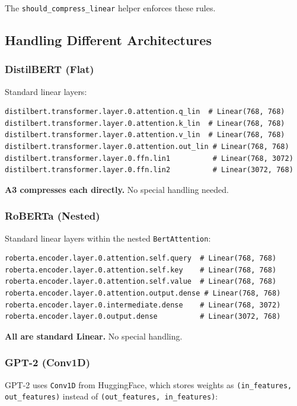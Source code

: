 The \texttt{should\_compress\_linear} helper enforces these rules.

\subsection{Handling Different Architectures}

\subsubsection{DistilBERT (Flat)}

Standard linear layers:

\begin{lstlisting}
distilbert.transformer.layer.0.attention.q_lin  # Linear(768, 768)
distilbert.transformer.layer.0.attention.k_lin  # Linear(768, 768)
distilbert.transformer.layer.0.attention.v_lin  # Linear(768, 768)
distilbert.transformer.layer.0.attention.out_lin # Linear(768, 768)
distilbert.transformer.layer.0.ffn.lin1          # Linear(768, 3072)
distilbert.transformer.layer.0.ffn.lin2          # Linear(3072, 768)
\end{lstlisting}

\textbf{A3 compresses each directly.} No special handling needed.

\subsubsection{RoBERTa (Nested)}

Standard linear layers within the nested \texttt{BertAttention}:

\begin{lstlisting}
roberta.encoder.layer.0.attention.self.query  # Linear(768, 768)
roberta.encoder.layer.0.attention.self.key    # Linear(768, 768)
roberta.encoder.layer.0.attention.self.value  # Linear(768, 768)
roberta.encoder.layer.0.attention.output.dense # Linear(768, 768)
roberta.encoder.layer.0.intermediate.dense    # Linear(768, 3072)
roberta.encoder.layer.0.output.dense          # Linear(3072, 768)
\end{lstlisting}

\textbf{All are standard Linear.} No special handling.

\subsubsection{GPT-2 (Conv1D)}

GPT-2 uses \texttt{Conv1D} from HuggingFace, which stores weights as 
\texttt{(in\_features, out\_features)} instead of \texttt{(out\_features, in\_features)}:

